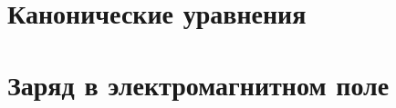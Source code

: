 
% 




\setcounter{section}{1}
\section{Канонические уравнения}
\setcounter{subsection}{7}



\setcounter{section}{2}
\section{Заряд в электромагнитном поле}
\setcounter{subsection}{15}

